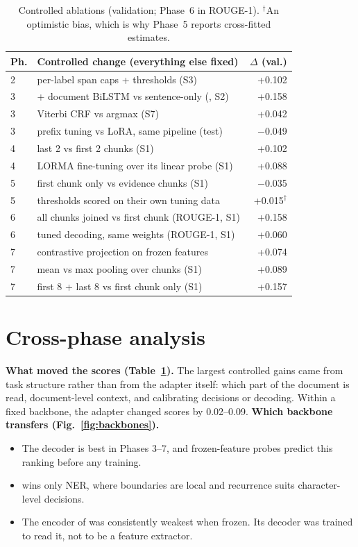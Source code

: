 \begin{table}[t]\centering\footnotesize\setlength{\tabcolsep}{3pt}
\begin{tabularx}{\columnwidth}{@{}l X r@{}}\toprule
Ph. & Controlled change (everything else fixed) & $\Delta$ (val.) \\\midrule
2 & per-label span caps + thresholds (S3) & +0.102 \\
3 & + document BiLSTM vs sentence-only (\A{}, S2) & +0.158 \\
3 & Viterbi CRF vs argmax (S7) & +0.042 \\
3 & prefix tuning vs LoRA, same pipeline (test) & $-$0.049 \\
4 & last 2 vs first 2 chunks (S1) & +0.102 \\
4 & LORMA fine-tuning over its linear probe (S1) & +0.088 \\
5 & first chunk only vs evidence chunks (S1) & $-$0.035 \\
5 & thresholds scored on their own tuning data & +0.015$^\dagger$ \\
6 & all chunks joined vs first chunk (ROUGE-1, S1) & +0.158 \\
6 & tuned decoding, same weights (ROUGE-1, S1) & +0.060 \\
7 & contrastive projection on frozen \C{} features & +0.074 \\
7 & mean vs max pooling over chunks (S1) & +0.089 \\
7 & first 8 + last 8 vs first chunk only (S1) & +0.157 \\\bottomrule
\end{tabularx}
\caption{Controlled ablations (validation; Phase~6 in ROUGE-1). $^\dagger$An optimistic bias, which is why Phase~5 reports cross-fitted estimates.}\label{tab:abl}\vspace{-1em}
\end{table}

\section{Cross-phase analysis}\label{sec:analysis}
\textbf{What moved the scores (Table~\ref{tab:abl}).} The largest controlled gains came from task structure rather than from the adapter itself: which part of the document is read, document-level context, and calibrating decisions or decoding. Within a fixed backbone, the adapter changed scores by 0.02--0.09.
\textbf{Which backbone transfers (Fig.~\ref{fig:backbones}).}
\begin{itemize}
\item The decoder \A{} is best in Phases 3--7, and frozen-feature probes predict this ranking before any training.
\item \C{} wins only NER, where boundaries are local and recurrence suits character-level decisions.
\item The encoder of \B{} was consistently weakest when frozen. Its decoder was trained to read it, not to be a feature extractor.
\end{itemize}


